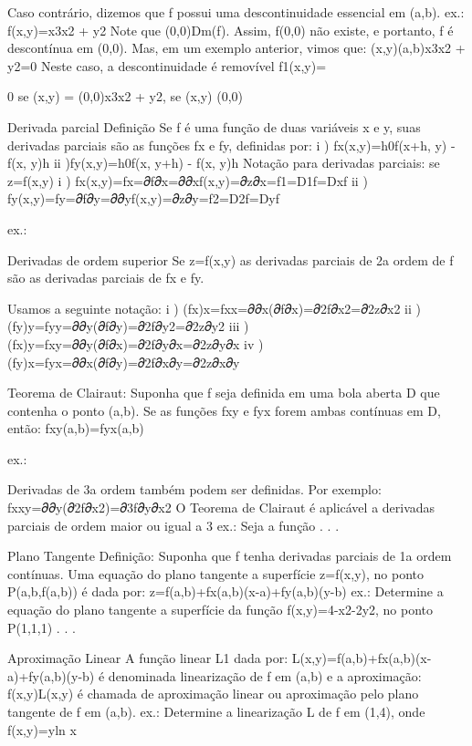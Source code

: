 {{              Caso contrário, dizemos que f possui uma descontinuidade essencial em (a,b).
    ex.: f(x,y)=x3x2 + y2
            Note que (0,0)Dm(f). Assim, f(0,0) não existe, e portanto, f é descontínua em (0,0). Mas, em 
            um exemplo anterior, vimos que:
            (x,y)(a,b)x3x2 + y2=0
            Neste caso, a descontinuidade é removível
            f1(x,y)={ 0 se (x,y) = (0,0)x3x2 + y2, se (x,y)  (0,0)

Derivada parcial
Definição
    Se f é uma função de duas variáveis x e y, suas derivadas parciais são as funções fx e fy, definidas por:
        i ) fx(x,y)=h0f(x+h, y) - f(x, y)h
        ii )fy(x,y)=h0f(x, y+h) - f(x, y)h
Notação para derivadas parciais: se z=f(x,y)
    i ) fx(x,y)=fx=𝜕f𝜕x=𝜕𝜕xf(x,y)=𝜕z𝜕x=f1=D1f=Dxf
    ii ) fy(x,y)=fy=𝜕f𝜕y=𝜕𝜕yf(x,y)=𝜕z𝜕y=f2=D2f=Dyf

ex.:











Derivadas de ordem superior
    Se z=f(x,y) as derivadas parciais de 2a ordem de f são as derivadas parciais de fx e fy.

    Usamos a seguinte notação:
        i ) (fx)x=fxx=𝜕𝜕x(𝜕f𝜕x)=𝜕2f𝜕x2=𝜕2z𝜕x2
        ii ) (fy)y=fyy=𝜕𝜕y(𝜕f𝜕y)=𝜕2f𝜕y2=𝜕2z𝜕y2
        iii ) (fx)y=fxy=𝜕𝜕y(𝜕f𝜕x)=𝜕2f𝜕y𝜕x=𝜕2z𝜕y𝜕x
        iv ) (fy)x=fyx=𝜕𝜕x(𝜕f𝜕y)=𝜕2f𝜕x𝜕y=𝜕2z𝜕x𝜕y

Teorema de Clairaut:
    Suponha que f seja definida em uma bola aberta D que contenha o ponto (a,b). Se as funções fxy e fyx forem ambas contínuas em D, então:
        fxy(a,b)=fyx(a,b)

    ex.:

    Derivadas de 3a ordem também podem ser definidas. 
    Por exemplo:
        fxxy=𝜕𝜕y(𝜕2f𝜕x2)=𝜕3f𝜕y𝜕x2
    O Teorema de Clairaut é aplicável a derivadas parciais de ordem maior ou igual a 3
    ex.: Seja a função . . .


Plano Tangente
Definição:
    Suponha que f tenha derivadas parciais de 1a ordem contínuas. Uma equação do plano tangente a superfície z=f(x,y), no ponto P(a,b,f(a,b)) é dada por:
        z=f(a,b)+fx(a,b)(x-a)+fy(a,b)(y-b)
    ex.: Determine a equação do plano tangente a superfície da função f(x,y)=4-x2-2y2, no ponto P(1,1,1) . . . 


Aproximação Linear
A função linear L1 dada por: 
        L(x,y)=f(a,b)+fx(a,b)(x-a)+fy(a,b)(y-b)
    é denominada linearização de f em (a,b) e a aproximação:
        f(x,y)L(x,y)
    é chamada de aproximação linear ou aproximação pelo plano tangente de f em (a,b).
    ex.: Determine a linearização L de f em (1,4), onde f(x,y)=yln x

}}}
